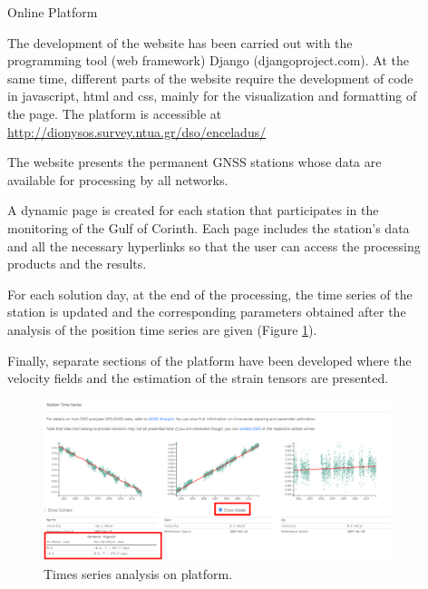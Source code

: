 \documentclass[final,a0,portrait]{beamer}
\newlength{\sepwid}
\newlength{\onecolwid}
\begin{document}
\begin{frame}[t]
\begin{columns}[t]
\begin{column}{\onecolwid}
\end{column} %

\begin{column}{\sepwid}\end{column} %


\begin{column}{\onecolwid} %


\begin{block}{Online Platform}
{\small
The development of the website has been carried out with the programming tool (web framework) Django (djangoproject.com). At the same time, different parts of the website require the development of code in javascript, html and css, mainly for the visualization and formatting of the page. The platform is accessible at \url{http://dionysos.survey.ntua.gr/dso/enceladus/} 

The website presents the permanent GNSS stations whose data are available for processing by all networks.

A dynamic page is created for each station that participates in the monitoring of the Gulf of Corinth. Each page includes the station's data and all the necessary hyperlinks so that the user can access the processing products and the results.

For each solution day, at the end of the processing, the time series of the station is updated and the corresponding parameters obtained after the analysis of the position time series are given (Figure \ref{fig:vels}).

Finally, separate sections of the platform have been developed where the velocity fields and the estimation of the strain tensors are presented.

}

\begin{figure}
    \includegraphics[width=1\onecolwid]{gsg2022_ts1.png}
    \caption{Times series analysis on platform.}
    \label{fig:vels}
\end{figure}


\end{block}
\end{column}
\end{columns}
\end{frame}
\end{document}
